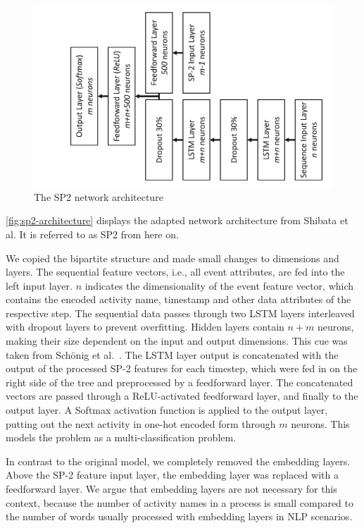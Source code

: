 \begin{figure}[!htb]
    \centering
    \includegraphics[width=.8\textwidth, angle=-90,origin=c]{gfx/sp2-network-architecture.pdf}
    \caption{The SP2 network architecture}
    \label{fig:sp2-architecture}
\end{figure}

\autoref{fig:sp2-architecture} displays the adapted network architecture from Shibata et al. It is referred to as SP2 from here on.

We copied the bipartite structure and made small changes to dimensions and layers.
The sequential feature vectors, i.e., all event attributes, are fed into the left input layer.
$n$ indicates the dimensionality of the event feature vector, which contains the encoded activity name, timestamp and other data attributes of the respective step.
The sequential data passes through two LSTM layers interleaved with dropout layers to prevent overfitting.
Hidden layers contain $n+m$ neurons, making their size dependent on the input and output dimensions.
This cue was taken from Schönig et al.~\cite{schoenig2018}.
The LSTM layer output is concatenated with the output of the processed SP-2 features for each timestep, which were fed in on the right side of the tree and preprocessed by a feedforward layer.
The concatenated vectors are passed through a ReLU-activated feedforward layer, and finally to the output layer.
A Softmax activation function is applied to the output layer, putting out the next activity in one-hot encoded form through $m$ neurons.
This models the problem as a multi-classification problem.

In contrast to the original model, we completely removed the embedding layers.
Above the SP-2 feature input layer, the embedding layer was replaced with a feedforward layer.
We argue that embedding layers are not necessary for this context, because the number of activity names in a process is small compared to the number of words usually processed with embedding layers in NLP scenarios.


